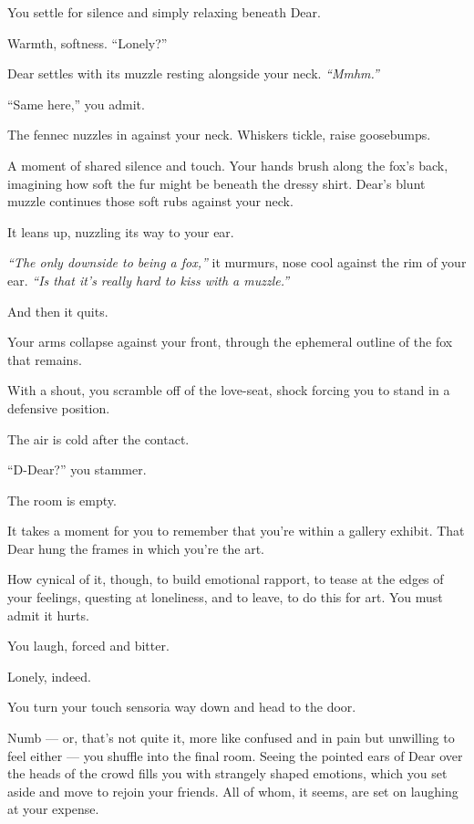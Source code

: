 You settle for silence and simply relaxing beneath Dear.

Warmth, softness. ``Lonely?''

Dear settles with its muzzle resting alongside your neck. \emph{``Mmhm.''}

``Same here,'' you admit.

The fennec nuzzles in against your neck. Whiskers tickle, raise goosebumps.

A moment of shared silence and touch. Your hands brush along the fox's back, imagining how soft the fur might be beneath the dressy shirt. Dear's blunt muzzle continues those soft rubs against your neck.

It leans up, nuzzling its way to your ear.

\emph{``The only downside to being a fox,''} it murmurs, nose cool against the rim of your ear. \emph{``Is that it's really hard to kiss with a muzzle.''}

\newpage

\null
\vfill

And then it quits.

\vfill

\newpage

\null
\vfill

Your arms collapse against your front, through the ephemeral outline of the fox that remains.

With a shout, you scramble off of the love-seat, shock forcing you to stand in a defensive position.

The air is cold after the contact.

``D-Dear?'' you stammer.

The room is empty.

It takes a moment for you to remember that you're within a gallery exhibit. That Dear hung the frames in which you're the art.

How cynical of it, though, to build emotional rapport, to tease at the edges of your feelings, questing at loneliness, and to leave, to do this for art. You must admit it hurts.

You laugh, forced and bitter.

Lonely, indeed.

You turn your touch sensoria way down and head to the door.

\vfill

\newpage
\null
\newpage
\null
\newpage

Numb --- or, that's not quite it, more like confused and in pain but unwilling to feel either --- you shuffle into the final room. Seeing the pointed ears of Dear over the heads of the crowd fills you with strangely shaped emotions, which you set aside and move to rejoin your friends. All of whom, it seems, are set on laughing at your expense.

